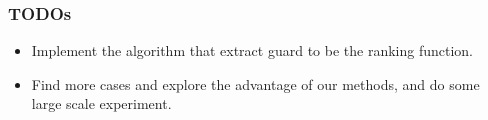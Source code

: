 \documentclass[10pt]{beamer}
\begin{document}
\begin{frame}\frametitle{TODOs}
\begin{itemize}
\item Implement the algorithm that extract guard to be the ranking function.

\item Find more cases and explore the advantage of our methods, and do some large scale experiment.
\end{itemize}
\end{frame}
\end{document}
